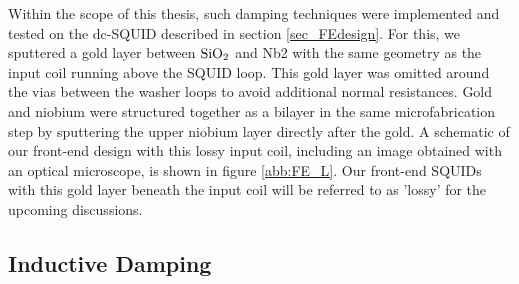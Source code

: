 Within the scope of this thesis, such damping techniques were implemented and tested on the dc-SQUID described in section \ref{sec_FEdesign}. For this, we sputtered a gold layer between $\rm SiO_2$ and Nb2 with the same geometry as the input coil running above the SQUID loop. This gold layer was omitted around the vias between the washer loops to avoid additional normal resistances. Gold and niobium were structured together as a bilayer in the same microfabrication step by sputtering the upper niobium layer directly after the gold. A schematic of our front-end design with this lossy input coil, including an image obtained with an optical microscope, is shown in figure \ref{abb:FE_L}. Our front-end SQUIDs with this gold layer beneath the input coil will be referred to as 'lossy' for the upcoming discussions. 

\subsection{Inductive Damping} \label{subsec_ind_damp}

